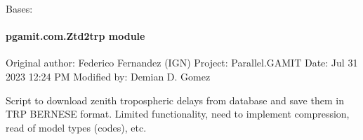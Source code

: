\documentclass[letterpaper,10pt,english]{sphinxmanual}
\begin{document}
\begin{fulllineitems}
\label{\detokenize{pgamit.com:pgamit.com.UpdateEarthquakes.AddEarthquakes}}
\pysigstartsignatures
\pysiglinewithargsret
{}
{}
{}
\pysigstopsignatures
\sphinxAtStartPar
Bases: 

\end{fulllineitems}


\begin{fulllineitems}
\label{\detokenize{pgamit.com:pgamit.com.UpdateEarthquakes.getTimeSegments2}}
\pysigstartsignatures
\pysiglinewithargsret
{}
{\sphinxparamcomma {}}
{}
\pysigstopsignatures
\end{fulllineitems}


\begin{fulllineitems}
\label{\detokenize{pgamit.com:pgamit.com.UpdateEarthquakes.main}}
\pysigstartsignatures
\pysiglinewithargsret
{}
{}
{}
\pysigstopsignatures
\end{fulllineitems}



\paragraph{pgamit.com.Ztd2trp module}
\label{\detokenize{pgamit.com:module-pgamit.com.Ztd2trp}}\label{\detokenize{pgamit.com:pgamit-com-ztd2trp-module}}
\sphinxAtStartPar
Original author: Federico Fernandez (IGN)
Project: Parallel.GAMIT
Date: Jul 31 2023 12:24 PM
Modified by: Demian D. Gomez

\sphinxAtStartPar
Script to download zenith tropospheric delays from database and save them in TRP BERNESE format.
Limited functionality, need to implement compression, read of model types (codes), etc.
\end{document}
